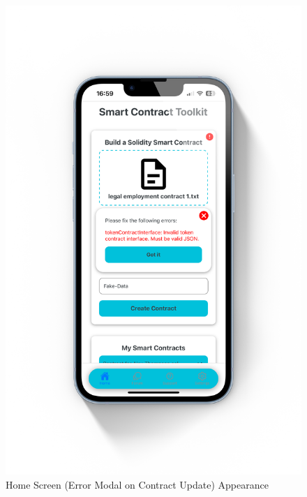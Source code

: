\begin{figure}[!ht]
    \centering
    \begin{minipage}{0.49\textwidth}
        \centering
        \includegraphics[scale=0.07]{LATEX/Appendices/Images/Software/Frontend/home_screen_3.png}
        \caption{Home Screen (Error Modal on Contract Update) Appearance}
        \label{fig:home screen 3}
    \end{minipage}\hfill %
    \begin{minipage}{0.49\textwidth}
        \centering

\end{minipage}
\end{figure}
